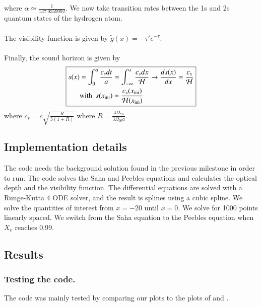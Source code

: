 \documentclass{aa}
\begin{document}
where $\alpha \simeq \frac{1}{137.0359992}$. We now take transition rates between the 1s and 2s quantum states of the hydrogen atom.\\
\\
The visibility function is given by $\tilde{g}(x) = -\tau'e^{-\tau}$. \\
\\
Finally, the sound horizon is given by 
$$\boxed{\begin{aligned}   
   s(x) &= \int_0^{a} \frac{c_s dt}{a} = \int_{-\infty}^{x} \frac{c_s dx}{\mathcal{H}} \to \frac{ds(x)}{dx}
 = \frac{c_s}{\mathcal{H}}\\
 &\text{with}\,\,\,s(x_{\rm ini}) = \frac{c_s(x_{\rm ini})}{\mathcal{H}(x_{\rm ini})}     
\end{aligned}}$$ 
 where $c_s = c \sqrt{\frac{R}{3(1+R)}}$ where $R = \frac{4\Omega_{\gamma 0}}{3\Omega_{b 0} a}$.

\subsection{Implementation details}
The code needs the background solution found in the previous milestone in order to run. The code solves the Saha and Peebles equations and calculates the optical depth and the visibility function.
The differential equations are solved with a Runge-Kutta 4 ODE solver, and the result is splines using a cubic spline.
We solve the quantities of interest from $x=-20$ until $x=0$. We solve for 1000 points linearly spaced. 
We switch from the Saha equation to the Peebles equation when $X_e$ reaches 0.99.



\subsection{Results}
\subsubsection{Testing the code.}
The code was mainly tested by comparing our plots to the plots of \cite{winther:2023} and \cite{Callin}.
\end{document}

